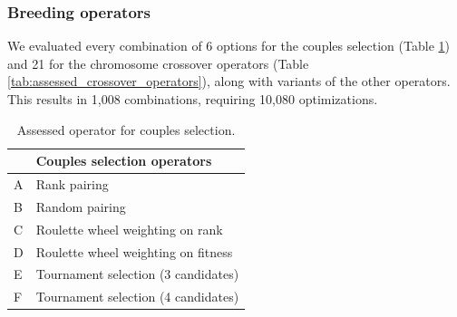\documentclass[twocol]{ametsoc}
\begin{document}
\subsubsection{Breeding operators}

We evaluated every combination of 6 options for the couples selection (Table \ref{tab:assessed_couples_selection_operators}) and 21 for the chromosome crossover operators (Table \ref{tab:assessed_crossover_operators}), along with variants of the other operators. This results in 1,008 combinations, requiring 10,080 optimizations.

\begin{table}[htbp]
	\caption{Assessed operator for couples selection.}
	\begin{center}
		\begin{tabular}{ll}
			\hline\hline  & \textbf{Couples selection operators} \\ 
			\hline 
			A & Rank pairing \\ 
			B & Random pairing \\ 
			C & Roulette wheel weighting on rank \\ 
			D & Roulette wheel weighting on fitness \\ 
			E & Tournament selection (3 candidates) \\ 
			F & Tournament selection (4 candidates) \\ 
			\hline 
		\end{tabular}
	\end{center}
	\label{tab:assessed_couples_selection_operators}
\end{table}
\end{document}
